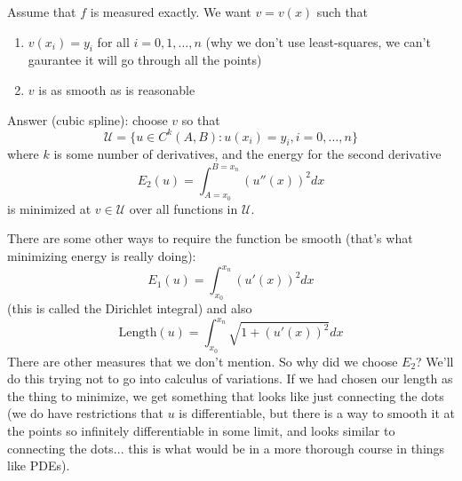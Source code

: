 \documentclass{article}
\theoremstyle{plain}
\theoremstyle{remark}
\begin{document}
Assume that $f$ is measured exactly.
We want $v = v(x)$ such that
\begin{enumerate}
	\item $v(x_i) = y_i$ for all $i = 0,1,\dots,n$ (why we don't use least-squares,
		we can't gaurantee it will go through all the points)
	\item $v$ is as smooth as is reasonable
\end{enumerate}
Answer (cubic spline): choose $v$ so that
\[
	\mathcal{U} = \{u \in C^{k}(A,B) \colon
	u(x_i) = y_i, i = 0,\dots,n\}
\]
where $k$ is some number of derivatives,
and the energy for the second derivative
\[
	E_2(u) = \int_{A = x_0}^{B = x_n} (u''(x))^2 dx
\]
is minimized at $v \in \mathcal{U}$ over all functions in $\mathcal{U}$.

There are some other ways to require the function be smooth
(that's what minimizing energy is really doing):
\[
	E_1(u) = \int_{x_0}^{x_n} (u'(x))^2dx
\]
(this is called the Dirichlet integral) and also
\[
	\text{Length}(u) = \int_{x_0}^{x_n} \sqrt{1 + (u'(x))^2}dx
\]
There are other measures that we don't mention.
So why did we choose $E_2$?
We'll do this trying not to go into calculus of variations.
If we had chosen our length as the thing to minimize,
we get something that looks like just connecting the dots
(we do have restrictions that $u$ is differentiable,
but there is a way to smooth it at the points so infinitely differentiable
in some limit, and looks similar to connecting the dots... this is what would be in
a more thorough course in things like PDEs).
\end{document}
